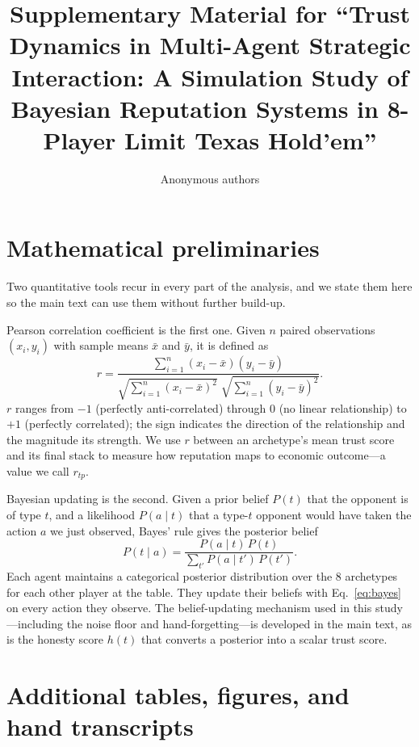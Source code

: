 \documentclass[journal,onecolumn]{IEEEtran}
\title{Supplementary Material for ``Trust Dynamics in Multi-Agent
  Strategic Interaction: A Simulation Study of Bayesian Reputation
  Systems in 8-Player Limit Texas Hold'em''}
\author{Anonymous authors}
\begin{document}
\maketitle

\section{Mathematical preliminaries}
Two quantitative tools recur in every part of the analysis, and we
state them here so the main text can use them without further
build-up.

Pearson correlation coefficient is the first one. Given $n$ paired
observations $(x_i, y_i)$ with sample means $\bar{x}$ and
$\bar{y}$, it is defined as
\begin{equation}
  r = \frac{\sum_{i=1}^{n}(x_i-\bar{x})(y_i-\bar{y})}
           {\sqrt{\sum_{i=1}^{n}(x_i-\bar{x})^2}\;
            \sqrt{\sum_{i=1}^{n}(y_i-\bar{y})^2}}.
  \label{eq:pearson}
\end{equation}
$r$ ranges from $-1$ (perfectly anti-correlated) through $0$ (no
linear relationship) to $+1$ (perfectly correlated); the sign
indicates the direction of the relationship and the magnitude its
strength. We use $r$ between an archetype's mean trust score and
its final stack to measure how reputation maps to economic
outcome---a value we call $r_{tp}$.

Bayesian updating is the second. Given a prior belief $P(t)$ that
the opponent is of type $t$, and a likelihood $P(a\mid t)$ that a
type-$t$ opponent would have taken the action $a$ we just
observed, Bayes' rule gives the posterior belief
\begin{equation}
  P(t\mid a) = \frac{P(a\mid t)\,P(t)}
                    {\sum_{t'} P(a\mid t')\,P(t')}.
  \label{eq:bayes}
\end{equation}
Each agent maintains a categorical posterior distribution over the
8 archetypes for each other player at the table. They update their
beliefs with Eq.~\ref{eq:bayes} on every action they observe. The
belief-updating mechanism used in this study---including the noise
floor and hand-forgetting---is developed in the main text, as is the
honesty score $h(t)$ that converts a posterior into a scalar trust
score.

\section{Additional tables, figures, and hand transcripts}
\end{document}
